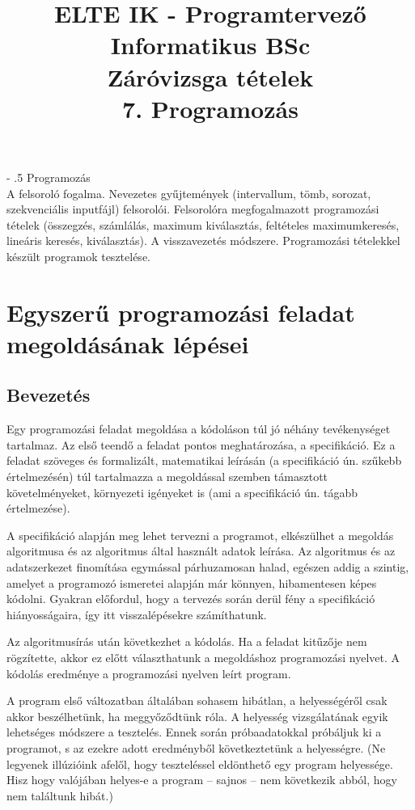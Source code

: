 \documentclass[margin=0px]{article}
\title{\textbf{{\Large ELTE IK - Programtervező Informatikus BSc} \vspace{0.2cm} \\ {\huge Záróvizsga tételek}} \vspace{0.3cm} \\ 7. Programozás}
\author{}
\date{}
\makeatletter
\newenvironment{tetel}[1]{\paragraph{#1 \\}}{}
\renewcommand\paragraph{%
	\@startsection{paragraph}{4}{0mm}%
	{-\baselineskip}%
	{.5\baselineskip}%
	{\normalfont\normalsize\bfseries}}
\makeatother
\begin{document}
\maketitle

\begin{tetel}{Programozás}
    A felsoroló fogalma. Nevezetes gyűjtemények (intervallum, tömb, sorozat, szekvenciális inputfájl) felsorolói. Felsorolóra megfogalmazott programozási tételek (összegzés, számlálás, maximum kiválasztás, feltételes maximumkeresés, lineáris keresés, kiválasztás). A visszavezetés módszere. Programozási tételekkel készült programok tesztelése.
\end{tetel}

\section{Egyszerű programozási feladat megoldásának lépései}
\subsection{Bevezetés}
Egy programozási feladat megoldása a kódoláson túl jó néhány tevékenységet tartalmaz.
Az első teendő a feladat pontos meghatározása, a specifikáció. Ez a feladat szöveges és formalizált, matematikai leírásán (a specifikáció ún. szűkebb értelmezésén) túl tartalmazza a megoldással szemben támasztott követelményeket, környezeti igényeket is (ami a specifikáció ún. tágabb értelmezése).

A specifikáció alapján meg lehet tervezni a programot, elkészülhet a megoldás algoritmusa és az algoritmus által használt adatok leírása. Az algoritmus és az adatszerkezet finomítása egymással párhuzamosan halad, egészen addig a szintig, amelyet a programozó ismeretei alapján már könnyen, hibamentesen képes kódolni. Gyakran előfordul, hogy a tervezés során derül fény a specifikáció hiányosságaira, így itt visszalépésekre számíthatunk.

Az algoritmusírás után következhet a kódolás. Ha a feladat kitűzője nem rögzítette, akkor ez előtt választhatunk a megoldáshoz programozási nyelvet. A kódolás eredménye a programozási nyelven leírt program.

A program első változatban általában sohasem hibátlan, a helyességéről csak akkor beszélhetünk, ha meggyőződtünk róla. A helyesség vizsgálatának egyik lehetséges módszere a tesztelés. Ennek során próbaadatokkal próbáljuk ki a programot, s az ezekre adott eredményből következtetünk a helyességre. (Ne legyenek illúzióink afelől, hogy teszteléssel eldönthető egy program helyessége. Hisz hogy valójában helyes-e a program – sajnos – nem következik abból, hogy nem találtunk hibát.)
\end{document}
